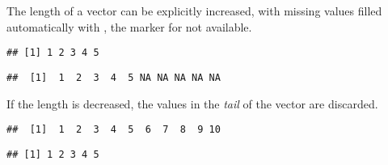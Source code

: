 \documentclass[krantz2]{krantz}\usepackage{knitr}
\begin{document}
\begin{explainbox}
The length of a vector can be explicitly increased, with missing values filled automatically with , the marker for not available.

\begin{knitrout}\footnotesize
{}\color{fgcolor}\begin{kframe}
\begin{alltt}
 \hlkwb{<-} \hlopt{:}
\end{alltt}
\begin{verbatim}
## [1] 1 2 3 4 5
\end{verbatim}
\begin{alltt}
 \hlkwb{<-} 
\end{alltt}
\begin{verbatim}
##  [1]  1  2  3  4  5 NA NA NA NA NA
\end{verbatim}
\end{kframe}
\end{knitrout}

If the length is decreased, the values in the \emph{tail} of the vector are discarded.

\begin{knitrout}\footnotesize
{}\color{fgcolor}\begin{kframe}
\begin{alltt}
 \hlkwb{<-} \hlopt{:}
\end{alltt}
\begin{verbatim}
##  [1]  1  2  3  4  5  6  7  8  9 10
\end{verbatim}
\begin{alltt}
 \hlkwb{<-} 
\end{alltt}
\begin{verbatim}
## [1] 1 2 3 4 5
\end{verbatim}
\end{kframe}
\end{knitrout}

\end{explainbox}
\label{par:numeric:vectors:end}
\end{document}

